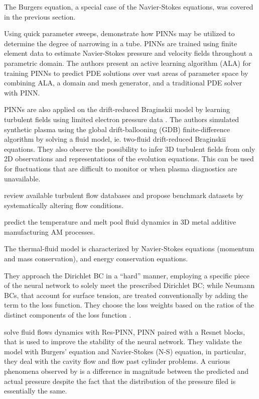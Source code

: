 \documentclass[pdflatex,sn-basic]{sn-jnl}%
\theoremstyle{thmstyleone}%
\theoremstyle{thmstyletwo}%
\theoremstyle{thmstylethree}%
\begin{document}
The Burgers equation, a special case of the Navier-Stokes equations, was covered in the previous section.

Using quick parameter sweeps, \cite{Art2021_ActiveTrainingPhysics_KinAK} demonstrate how PINNs may be utilized to determine the degree of narrowing in a tube. PINNs are trained using finite element data to estimate Navier-Stokes pressure and velocity fields throughout a parametric domain.
The authors present an active learning algorithm (ALA) for training PINNs to predict PDE solutions over vast areas of parameter space by combining ALA, a domain and mesh generator, and a traditional PDE solver with PINN.

PINNs are also applied on the drift-reduced Braginskii model by learning turbulent fields using limited electron pressure data \citep{Mat2021_UncoveringTurbulentPlasma_FraMFH}. The authors simulated synthetic plasma using the global drift-ballooning (GDB) finite-difference algorithm by solving a fluid model, ie.  two-fluid drift-reduced Braginskii equations. They also observe the possibility to infer 3D turbulent fields from only 2D observations and representations of the evolution equations. This can be used for fluctuations that are difficult to monitor or when plasma diagnostics are unavailable.

\cite{Xia2020_FlowsOverPeriodic_WuXWLD} review available turbulent flow databases and propose  benchmark datasets by systematically altering flow conditions. 

\cite{Zhu2021_MachineLearningMetal_LiuZLY} predict the temperature and melt pool fluid dynamics in 3D metal additive manufacturing AM processes.

The thermal-fluid model is characterized by Navier-Stokes equations (momentum and mass conservation), and energy conservation equations.

They approach the Dirichlet BC in a ``hard'' manner, employing a specific piece of the neural network to solely meet the prescribed Dirichlet BC; while Neumann BCs, that account for surface tension, are treated conventionally by adding the term to the loss function. They choose the loss weights based on the ratios of the distinct components of the loss function \citep{Zhu2021_MachineLearningMetal_LiuZLY}.

\cite{Che2021_DeepLearningMethod_ZhaCZ} solve fluid flows dynamics with Res-PINN, PINN paired with a Resnet blocks, that is used to improve the stability of the neural network. They validate the model with Burgers' equation and Navier-Stokes (N-S) equation, in particular, they deal with the cavity flow and flow past cylinder problems.
A curious phenomena observed by \cite{Che2021_DeepLearningMethod_ZhaCZ} is a difference in magnitude between the predicted and actual pressure despite the fact that the distribution of the pressure filed is essentially the same. 
\end{document}

